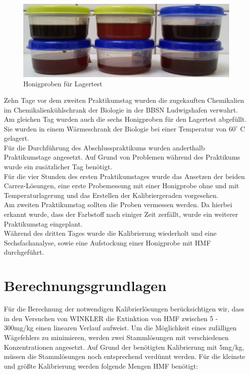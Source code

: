 \begin{figure}[tbp]
    \centering
        \includegraphics[width=1.00\textwidth]{../Bilder/20150504_141528.jpg}
    \caption{Honigproben für Lagertest}
    \label{fig:Lagertest}
\end{figure}

Zehn Tage vor dem zweiten Praktikumstag wurden die zugekauften Chemikalien im Chemikalienkühlschrank der Biologie in der BBSN Ludwigshafen verwahrt. Am gleichen Tag wurden auch die sechs Honigproben für den Lagertest abgefüllt. Sie wurden in einem Wärmeschrank der Biologie bei einer Temperatur von $60^\circ$ C gelagert.\\
Für die Durchführung des Abschlusspraktikums wurden anderthalb Praktikumstage angesetzt. Auf Grund von Problemen während des Praktikums wurde ein zusätzlicher Tag benötigt. \\
Für die vier Stunden des ersten Praktikumstages wurde das Ansetzen der beiden Carrez-Lösungen, eine erste Probemessung mit einer Honigprobe ohne und mit Temperaturlagerung und das Erstellen der Kalibriergeraden vorgesehen.\\
Am zweiten Praktikumstag sollten die Proben vermessen werden. Da hierbei erkannt wurde, dass der Farbstoff nach einiger Zeit zerfällt, wurde ein weiterer Praktikumstag eingeplant.\\
Während des dritten Tages wurde die Kalibrierung wiederholt und eine Sechsfachanalyse, sowie eine Aufstockung einer Honigprobe mit HMF durchgeführt.\\

\section{Berechnungsgrundlagen}
Für die Berechnung der notwendigen Kalibrierlösungen berücksichtigen wir, dass in den Versuchen von WINKLER die Extinktion von HMF zwischen 5 - 300mg/kg einen linearen Verlauf aufweist. Um die Möglichkeit eines zufälligen Wägefehlers zu minimieren, werden zwei Stammlösungen mit verschiedenen Konzentrationen angesetzt. Auf Grund der benötigten Kalibrierung mit 5mg/kg, müssen die Stammlösungen noch entsprechend verdünnt werden. Für die kleinste und größte Kalibrierung werden folgende Mengen HMF benötigt:

